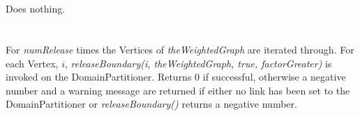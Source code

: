  \\
  \\ 
Does nothing. \\

 \\
 \\ 
For {\em numRelease} times the Vertices of {\em theWeightedGraph} are
iterated through. For each Vertex, $i$, {\em releaseBoundary(i,
theWeightedGraph, true, factorGreater)} is invoked on
the DomainPartitioner. Returns $0$ if successful, otherwise a negative
number and a warning message are returned if either no link has been
set to the DomainPartitioner or {\em releaseBoundary()} returns a
negative number. \\ 



